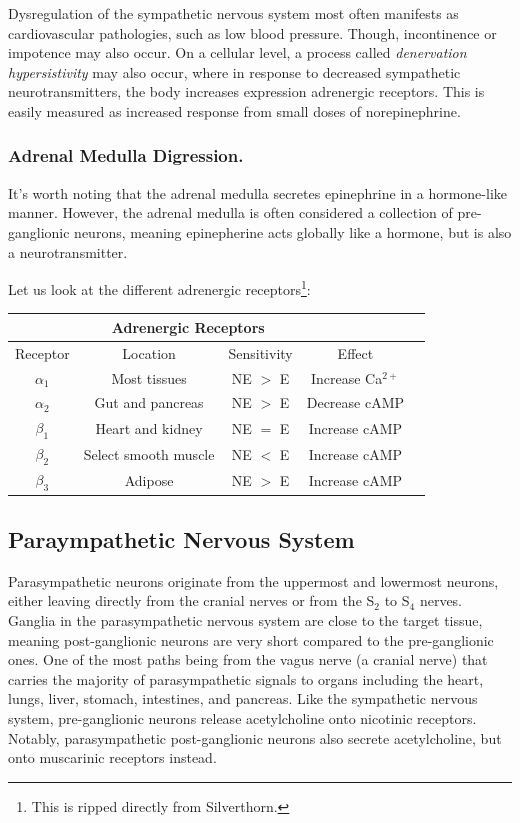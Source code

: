 \documentclass[12pt]{report}
\begin{document}
Dysregulation of the sympathetic nervous system most often manifests as cardiovascular pathologies, such as low blood pressure. Though, incontinence or impotence may also occur. On a cellular level, a process called \textit{denervation hypersistivity} may also occur, where in response to decreased sympathetic neurotransmitters, the body increases expression adrenergic receptors. This is easily measured as increased response from small doses of norepinephrine. 

\subsubsection{Adrenal Medulla Digression.} 
It's worth noting that the adrenal medulla secretes epinephrine in a hormone-like manner. However, the adrenal medulla is often considered a collection of pre-ganglionic neurons, meaning epinepherine acts globally like a hormone, but is also a neurotransmitter.\newline

Let us look at the different adrenergic receptors\footnote{This is ripped directly from Silverthorn.}: 

\begin{table}[!htbp]
\centering
\begin{tabular}{*5c}
\toprule
{} &  \multicolumn{2}{c}{Adrenergic Receptors} & \\
\midrule
{Receptor}   & Location & Sensitivity & Effect \\
\midrule
$\alpha_1$  &  Most tissues & NE $>$ E & Increase Ca$^{2+}$   \\
$\alpha_2$  &  Gut and pancreas & NE $>$ E & Decrease cAMP  \\
$\beta_1$   &  Heart and kidney  &  NE $=$ E & Increase cAMP   \\
$\beta_2$   &  Select smooth muscle  &  NE $<$ E & Increase cAMP   \\
$\beta_3$  &  Adipose  & NE $>$ E & Increase cAMP   \\
\bottomrule
\end{tabular}
\end{table}

\subsection{Paraympathetic Nervous System}
Parasympathetic neurons originate from the uppermost and lowermost neurons, either leaving directly from the cranial nerves or from the S$_2$ to S$_4$ nerves. Ganglia in the parasympathetic nervous system are close to the target tissue, meaning post-ganglionic neurons are very short compared to the pre-ganglionic ones. One of the most paths being from the vagus nerve (a cranial nerve) that carries the majority of parasympathetic signals to organs including the heart, lungs, liver, stomach, intestines, and pancreas. Like the sympathetic nervous system, pre-ganglionic neurons release acetylcholine onto nicotinic receptors. Notably, parasympathetic post-ganglionic neurons also secrete acetylcholine, but onto muscarinic receptors instead. 
\end{document}
